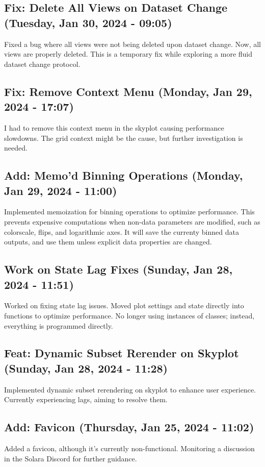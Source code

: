 \documentclass[a4paper]{article}
\begin{document}
\subsection*{Fix: Delete All Views on Dataset Change (Tuesday, Jan 30, 2024 - 09:05)}
Fixed a bug where all views were not being deleted upon dataset change. Now, all views are properly deleted. This is a temporary fix while exploring a more fluid dataset change protocol.

\subsection*{Fix: Remove Context Menu (Monday, Jan 29, 2024 - 17:07)}
I had to remove this context menu in the skyplot causing performance slowdowns. The grid context might be the cause, but further investigation is needed.

\subsection*{Add: Memo'd Binning Operations (Monday, Jan 29, 2024 - 11:00)}
Implemented memoization for binning operations to optimize performance. This prevents expensive computations when non-data parameters are modified, such as colorscale, flips, and logarithmic axes. It will save the currenty binned data outputs, and use them unless explicit data properties are changed.

\subsection*{Work on State Lag Fixes (Sunday, Jan 28, 2024 - 11:51)}
Worked on fixing state lag issues. Moved plot settings and state directly into functions to optimize performance. No longer using instances of classes; instead, everything is programmed directly.

\subsection*{Feat: Dynamic Subset Rerender on Skyplot (Sunday, Jan 28, 2024 - 11:28)}
Implemented dynamic subset rerendering on skyplot to enhance user experience. Currently experiencing lags, aiming to resolve them.

\subsection*{Add: Favicon (Thursday, Jan 25, 2024 - 11:02)}
Added a favicon, although it's currently non-functional. Monitoring a discussion in the Solara Discord for further guidance.
\end{document}
